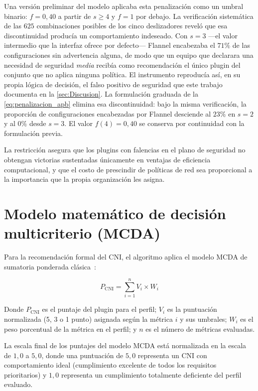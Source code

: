 Una versión preliminar del modelo aplicaba esta penalización como un umbral binario: $f=0{,}40$ a partir de $s\geq 4$ y $f=1$ por debajo. La verificación sistemática de las $625$ combinaciones posibles de los cinco deslizadores reveló que esa discontinuidad producía un comportamiento indeseado. Con $s=3$ ---el valor intermedio que la interfaz ofrece por defecto--- Flannel encabezaba el $71\%$ de las configuraciones sin advertencia alguna, de modo que un equipo que declarara una necesidad de seguridad \emph{media} recibía como recomendación el único plugin del conjunto que no aplica ninguna política. El instrumento reproducía así, en su propia lógica de decisión, el falso positivo de seguridad que este trabajo documenta en la \cref{sec:Discusion}. La formulación graduada de la \cref{eq:penalizacion_apb} elimina esa discontinuidad: bajo la misma verificación, la proporción de configuraciones encabezadas por Flannel desciende al $23\%$ en $s=2$ y al $0\%$ desde $s=3$. El valor $f(4)=0{,}40$ se conserva por continuidad con la formulación previa.

La restricción asegura que los plugins con falencias en el plano de seguridad no obtengan victorias sustentadas únicamente en ventajas de eficiencia computacional, y que el costo de prescindir de políticas de red sea proporcional a la importancia que la propia organización les asigna.

\section{Modelo matemático de decisión multicriterio (MCDA)} \label{sec:apb_mcda}

Para la recomendación formal del CNI, el algoritmo aplica el modelo MCDA de sumatoria ponderada clásica~\cite{ref34}:

\begin{equation}
  P_{\text{CNI}} = \sum_{i=1}^{n} V_i \times W_i
  \label{eq:mcda-formula}
\end{equation}

Donde $P_{\text{CNI}}$ es el puntaje del plugin para el perfil; $V_i$ es la puntuación normalizada (5, 3 o 1 punto) asignada según la métrica $i$ y sus umbrales; $W_i$ es el peso porcentual de la métrica en el perfil; y $n$ es el número de métricas evaluadas. 

La escala final de los puntajes del modelo MCDA está normalizada en la escala de $1,0$ a $5,0$, donde una puntuación de $5,0$ representa un CNI con comportamiento ideal (cumplimiento excelente de todos los requisitos prioritarios) y $1,0$ representa un cumplimiento totalmente deficiente del perfil evaluado.

